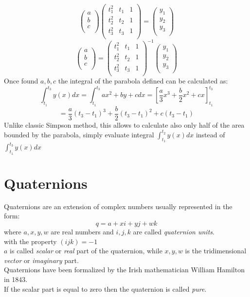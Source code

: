 $$ 
\begin{pmatrix}
a \\
b \\
c \\
\end{pmatrix}
\begin{pmatrix}
t_1^2 & t_1 & 1 \\
t_2^2 & t_2 & 1 \\
t_3^2 & t_3 & 1 \\
\end{pmatrix}
=
\begin{pmatrix}
y_1 \\
y_2 \\
y_3 \\
\end{pmatrix}
$$
$$ 
\begin{pmatrix}
a \\
b \\
c \\
\end{pmatrix}
=
\begin{pmatrix}
t_1^2 & t_1 & 1 \\
t_2^2 & t_2 & 1 \\
t_3^2 & t_3 & 1 \\
\end{pmatrix}^{-1}
\begin{pmatrix}
y_1 \\
y_2 \\
y_3 \\
\end{pmatrix}
$$
Once found $a,b,c$ the integral of the parabola defined can be calculated as:
$$
\int_{t_1}^{t_3} y(x)dx = \int_{t_1}^{t_3} ax^2 + by + c dx = [\frac{a}{3}x^3+\frac{b}{2}x^2+c{x}]_{t_1}^{t_3} 
$$
$$= \frac{a}{3}(t_3-t_1)^3+\frac{b}{2}(t_3-t_1)^2+c(t_3-t_1)$$
Unlike classic Simpson method, this allows to calculate also only half of the area bounded by the parabola, simply evaluate integral $\int_{t_1}^{t_2} y(x)dx$ instead of $\int_{t_1}^{t_3} y(x)dx $

\section{Quaternions}
Quaternions are an extension of complex numbers usually represented in the form:
$$ q = a + xi + yj + wk $$
where $a, x, y, w$ are real numbers and $i, j, k$ are called \textit{quaternion units}. \\
with the property ${(ijk)=-1}$  \\
$a$ is called \textit{scalar} or \textit{real} part of the quaternion, while $x,y,w$ is the tridimensional \textit{vector} or \textit{imaginary} part. \cite{amslaurea6701} \\
Quaternions have been formalized by the Irish mathematician William Hamilton in 1843. \\
If the scalar part is equal to zero then the quaternion is called \textit{pure}.

